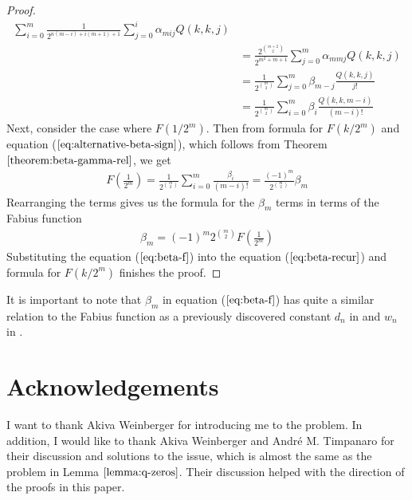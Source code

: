 \documentclass{article}
\begin{document}
\begin{proof}
\begin{align*}
    \sum_{i=0}^{m}
      \frac{1}{2^{n(m-i) + i(m+1)+1}}
      \sum_{j=0}^{i}
        \alpha_{mij}
        Q(k, k, j) \\
&= 
  \frac{2^{\binom{m+2}{2}}}
       {2^{m^2+m+1}}
  \sum_{j=0}^{m}
    \alpha_{mmj}
    Q(k, k, j) \\
&= 
  \frac{1}{2^{\binom{m}{2}}}
  \sum_{j=0}^{m}
    \beta_{m-j}
    \frac{Q(k, k, j)}{j!} \\
&= 
  \frac{1}{2^{\binom{m}{2}}}
  \sum_{i=0}^{m}
    \beta_{i}
    \frac{Q(k, k, m-i)}{(m-i)!}
\end{align*}
Next, consider the case where $F(1/2^m)$. Then from formula for $F(k/2^m)$ and equation ($\ref{eq:alternative-beta-sign}$), which follows from Theorem $\ref{theorem:beta-gamma-rel}$, we get
\begin{align*}
F\left(\frac{1}{2^m}\right)
= 
  \frac{1}{2^{\binom{m}{2}}}
  \sum_{i=0}^{m}
    \frac{\beta_{i}}{(m-i)!}
= 
  \frac{(-1)^m}{2^{\binom{m}{2}}} \beta_m
\end{align*}
Rearranging the terms gives us the formula for the $\beta_m$ terms in terms of the Fabius function
\begin{align}
\label{eq:beta-f}
\beta_m = (-1)^m2^{\binom{m}{2}}F\left(\frac{1}{2^m}\right)
\end{align}
Substituting the equation ($\ref{eq:beta-f}$) into the equation ($\ref{eq:beta-recur}$) and formula for $F(k/2^m)$ finishes the proof.
\end{proof}

It is important to note that $\beta_m$ in equation ($\ref{eq:beta-f}$) has quite a similar relation to the Fabius function as a previously discovered constant $d_n$ in \cite{dereyna2017arithmetic} and $w_n$ in \cite{slipperyslide}.

\section{Acknowledgements}
I want to thank Akiva Weinberger for introducing me to the problem. In addition, I would like to thank Akiva Weinberger and André M. Timpanaro for their discussion and solutions to the issue, which is almost the same as the problem in Lemma $\ref{lemma:q-zeros}$. Their discussion helped with the direction of the proofs in this paper.



\end{document}
